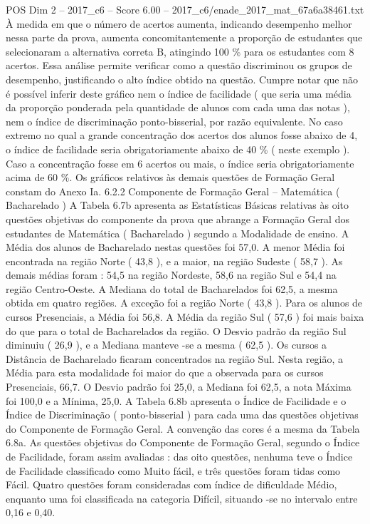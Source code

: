 \begin{textsample}{POS Dim 2 – 2017\_c6 – Score 6.00 – 2017\_c6/enade\_2017\_mat\_67a6a38461.txt}
À medida em que o número de acertos aumenta, indicando desempenho melhor nessa parte da prova, aumenta concomitantemente a proporção de estudantes que selecionaram a alternativa correta B, atingindo 100 \% para os estudantes com 8 acertos.
Essa análise permite verificar como a questão discriminou os grupos de desempenho, justificando o alto índice obtido na questão.
Cumpre notar que não é possível inferir deste gráfico nem o índice de facilidade ( que seria uma média da proporção ponderada pela quantidade de alunos com cada uma das notas ), nem o índice de discriminação ponto-bisserial, por razão equivalente.
No caso extremo no qual a grande concentração dos acertos dos alunos fosse abaixo de 4, o índice de facilidade seria obrigatoriamente abaixo de 40 \% ( neste exemplo ).
Caso a concentração fosse em 6 acertos ou mais, o índice seria obrigatoriamente acima de 60 \%.
Os gráficos relativos às demais questões de Formação Geral constam do Anexo Ia. 6.2.2 Componente de Formação Geral – Matemática ( Bacharelado ) A Tabela 6.7b apresenta as Estatísticas Básicas relativas às oito questões objetivas do componente da prova que abrange a Formação Geral dos estudantes de Matemática ( Bacharelado ) segundo a Modalidade de ensino.
A Média dos alunos de Bacharelado nestas questões foi 57,0.
A menor Média foi encontrada na região Norte ( 43,8 ), e a maior, na região Sudeste ( 58,7 ).
As demais médias foram : 54,5 na região Nordeste, 58,6 na região Sul e 54,4 na região Centro-Oeste.
A Mediana do total de Bacharelados foi 62,5, a mesma obtida em quatro regiões.
A exceção foi a região Norte ( 43,8 ).
Para os alunos de cursos Presenciais, a Média foi 56,8.
A Média da região Sul ( 57,6 ) foi mais baixa do que para o total de Bacharelados da região.
O Desvio padrão da região Sul diminuiu ( 26,9 ), e a Mediana manteve -se a mesma ( 62,5 ).
Os cursos a Distância de Bacharelado ficaram concentrados na região Sul.
Nesta região, a Média para esta modalidade foi maior do que a observada para os cursos Presenciais, 66,7.
O Desvio padrão foi 25,0, a Mediana foi 62,5, a nota Máxima foi 100,0 e a Mínima, 25,0.
A Tabela 6.8b apresenta o Índice de Facilidade e o Índice de Discriminação ( ponto-bisserial ) para cada uma das questões objetivas do Componente de Formação Geral.
A convenção das cores é a mesma da Tabela 6.8a.
As questões objetivas do Componente de Formação Geral, segundo o Índice de Facilidade, foram assim avaliadas : das oito questões, nenhuma teve o Índice de Facilidade classificado como Muito fácil, e três questões foram tidas como Fácil.
Quatro questões foram consideradas com índice de dificuldade Médio, enquanto uma foi classificada na categoria Difícil, situando -se no intervalo entre 0,16 e 0,40.

\end{textsample}

